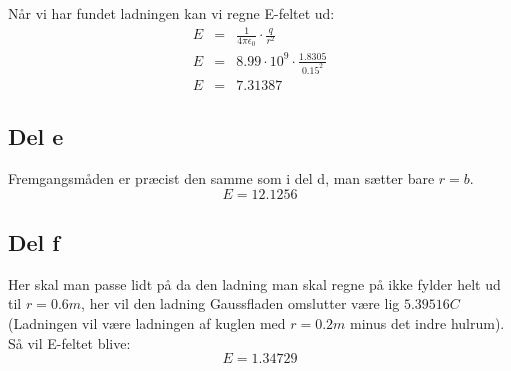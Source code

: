 Når vi har fundet ladningen kan vi regne E-feltet ud:
\begin{eqnarray}
	E &=& \frac{1}{4\pi \epsilon _0} \cdot \frac{q}{r^2} \\
	E &=& 8.99\cdot 10^9 \cdot \frac{1.8305}{0.15^2} \\
	E &=& 7.31387 
\end{eqnarray}

\subsection{Del e} %
\label{sub:del_e}
Fremgangsmåden er præcist den samme som i del d, man sætter bare $r = b$.
\begin{equation}
	E = 12.1256
\end{equation}

\subsection{Del f} %
\label{sub:del_f}
Her skal man passe lidt på da den ladning man skal regne på ikke fylder helt ud til $r = 0.6m$, her vil den ladning Gaussfladen omslutter være lig $5.39516C$ (Ladningen vil være ladningen af kuglen med $r = 0.2m$ minus det indre hulrum). Så vil E-feltet blive:
\begin{equation}
	E = 1.34729
\end{equation} 
